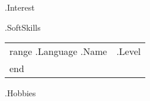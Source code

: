 \documentclass[11pt]{article}
\begin{document}
\begin{textblock}{5.1}
    {{.Interest}}



    {{.SoftSkills}}


    \begin{tabular}{@{}p{24mm} @{\hskip 0.2cm}p{24mm}@{}}
        {{range .Language}}
            {{.Name}} & {{.Level}} \\
        {{end}}
    \end{tabular}



    {{.Hobbies}}


    \end{textblock}
\end{document}
